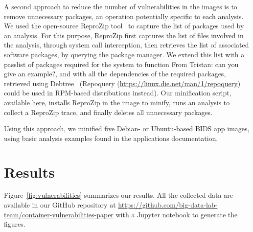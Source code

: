 \documentclass[a4paper,num-refs]{oup-contemporary}
\newcommand{\reprozip}[0]{ReproZip\xspace}
\newcommand{\tristan}[1]{\color{blue}From Tristan: #1\color{black}}
\begin{document}
A second approach to reduce the number of vulnerabilities in the images is
to remove unnecessary packages, an operation potentially specific to each
analysis. We used the open-source \reprozip tool~\cite{rampin2016reprozip}
to capture the list of packages used by an analysis. For this purpose,
\reprozip first captures the list of files involved in the analysis,
through system call interception, then retrieves the list of associated
software packages, by querying the package manager. We extend this list
with a passlist of packages required for the system to function
\tristan{can you give an example?}, and with all the dependencies of the
required packages, retrieved using Debtree~\cite{debtree} (Repoquery
(\url{https://linux.die.net/man/1/repoquery}) could be used in RPM-based
distributions instead). Our minification script, available
\href{https://github.com/big-data-lab-team/container-vulnerabilities-paper/tree/master/Scripts/minification}{here},
installs \reprozip in the image to minify, runs an analysis to collect a
\reprozip trace, and finally deletes all unnecessary packages. 

Using this approach, we minified five Debian- or Ubuntu-based BIDS app images,
using basic analysis examples found in the applications documentation.



\section{Results}

Figure~\ref{fig:vulnerabilities} summarizes our results. All the collected
data are available in our GitHub repository at
\url{https://github.com/big-data-lab-team/container-vulnerabilities-paper}
with a Jupyter notebook to generate the figures. 
\end{document}
